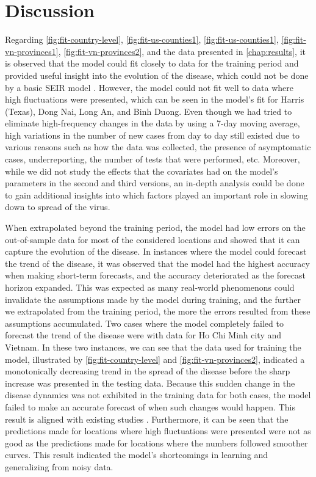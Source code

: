 \chapter{Discussion}
\label{chap:discussion}

Regarding \autoref{fig:fit-country-level}, \autoref{fig:fit-us-counties1}, \autoref{fig:fit-us-counties1}, \autoref{fig:fit-vn-provinces1}, \autoref{fig:fit-vn-provinces2}, and the data presented in \autoref{chap:results}, it is observed that the model could fit closely to data for the training period and provided useful insight into the evolution of the disease, which could not be done by a basic \gls{SEIR} model \cite{dandekarMachineLearningAidedGlobal2020a}.
However, the model could not fit well to data where high fluctuations were presented, which can be seen in the model's fit for Harris (Texas), Dong Nai, Long An, and Binh Duong.
Even though we had tried to eliminate high-frequency changes in the data by using a 7-day moving average, high variations in the number of new cases from day to day still existed due to various reasons such as how the data was collected, the presence of asymptomatic cases, underreporting, the number of tests that were performed, etc.
Moreover, while we did not study the effects that the covariates had on the model's parameters in the second and third versions, an in-depth analysis could be done to gain additional insights into which factors played an important role in slowing down to spread of the virus.

When extrapolated beyond the training period, the model had low errors on the out-of-sample data for most of the considered locations and showed that it can capture the evolution of the disease.
In instances where the model could forecast the trend of the disease, it was observed that the model had the highest accuracy when making short-term forecasts, and the accuracy deteriorated as the forecast horizon expanded.
This was expected as many real-world phenomenons could invalidate the assumptions made by the model during training, and the further we extrapolated from the training period, the more the errors resulted from these assumptions accumulated.
Two cases where the model completely failed to forecast the trend of the disease were with data for Ho Chi Minh city and Vietnam.
In these two instances, we can see that the data used for training the model, illustrated by \autoref{fig:fit-country-level} and \autoref{fig:fit-vn-provinces2}, indicated a monotonically decreasing trend in the spread of the disease before the sharp increase was presented in the testing data.
Because this sudden change in the disease dynamics was not exhibited in the training data for both cases, the model failed to make an accurate forecast of when such changes would happen.
This result is aligned with existing studies \cite{arikInterpretableSequenceLearning}.
Furthermore, it can be seen that the predictions made for locations where high fluctuations were presented were not as good as the predictions made for locations where the numbers followed smoother curves.
This result indicated the model's shortcomings in learning and generalizing from noisy data.

